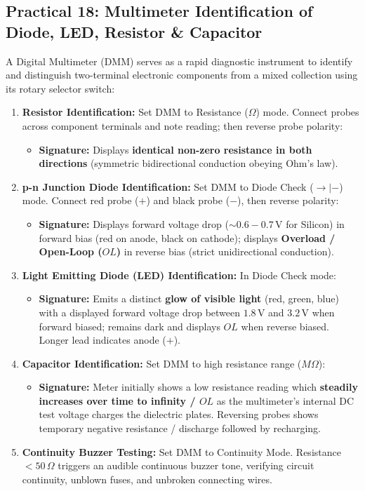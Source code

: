 \documentclass[10pt,twoside,openright]{book}
\begin{document}
\subsection{Practical 18: Multimeter Identification of Diode, LED, Resistor \& Capacitor}

\begin{usecasebox}
A Digital Multimeter (DMM) serves as a rapid diagnostic instrument to identify and distinguish two-terminal electronic components from a mixed collection using its rotary selector switch:
\begin{enumerate}[leftmargin=*]
  \item \textbf{Resistor Identification:}
  Set DMM to Resistance ($\Omega$) mode. Connect probes across component terminals and note reading; then reverse probe polarity:
  \begin{itemize}
    \item \textbf{Signature:} Displays \textbf{identical non-zero resistance in both directions} (symmetric bidirectional conduction obeying Ohm's law).
  \end{itemize}
  \item \textbf{p-n Junction Diode Identification:}
  Set DMM to Diode Check ($\to|-$) mode. Connect red probe ($+$) and black probe ($-$), then reverse polarity:
  \begin{itemize}
    \item \textbf{Signature:} Displays forward voltage drop ($\mathbf{\sim 0.6-0.7\,\mathrm{V}}$ for Silicon) in forward bias (red on anode, black on cathode); displays \textbf{Overload / Open-Loop ($OL$)} in reverse bias (strict unidirectional conduction).
  \end{itemize}
  \item \textbf{Light Emitting Diode (LED) Identification:}
  In Diode Check mode:
  \begin{itemize}
    \item \textbf{Signature:} Emits a distinct \textbf{glow of visible light} (red, green, blue) with a displayed forward voltage drop between $1.8\,\mathrm{V}$ and $3.2\,\mathrm{V}$ when forward biased; remains dark and displays $OL$ when reverse biased. Longer lead indicates anode ($+$).
  \end{itemize}
  \item \textbf{Capacitor Identification:}
  Set DMM to high resistance range ($M\Omega$):
  \begin{itemize}
    \item \textbf{Signature:} Meter initially shows a low resistance reading which \textbf{steadily increases over time to infinity / $OL$} as the multimeter's internal DC test voltage charges the dielectric plates. Reversing probes shows temporary negative resistance / discharge followed by recharging.
  \end{itemize}
  \item \textbf{Continuity Buzzer Testing:}
  Set DMM to Continuity Mode. Resistance $< 50\,\Omega$ triggers an audible continuous buzzer tone, verifying circuit continuity, unblown fuses, and unbroken connecting wires.
\end{enumerate}
\end{usecasebox}
\end{document}

